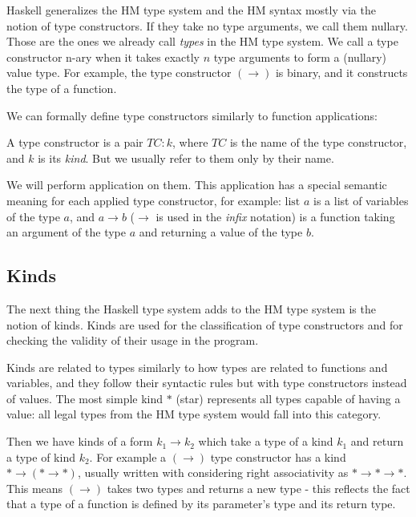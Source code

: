 Haskell generalizes the HM type system and the HM syntax mostly via the notion of type constructors. If they take no type arguments, we call them nullary. Those are the ones we already call \emph{types} in the HM type system. We call a type constructor n-ary when it takes exactly $n$ type arguments to form a (nullary) value type. For example, the type constructor $(\rightarrow)$ is binary, and it constructs the type of a function.

We can formally define type constructors similarly to function applications:

\begin{defn}
    A type constructor is a pair $TC : k$, where $TC$ is the name of the type constructor, and $k$ is its \emph{kind}. But we usually refer to them only by their name.

    We will perform application on them. This application has a special semantic meaning for each applied type constructor, for example: $\text{list } a$ is a list of variables of the type $a$, and $a \rightarrow b$ ($\rightarrow$ is used in the \emph{infix} notation) is a function taking an argument of the type $a$ and returning a value of the type $b$.
\end{defn}

\subsection{Kinds}

The next thing the Haskell type system adds to the HM type system is the notion of kinds. Kinds are used for the classification of type constructors and for checking the validity of their usage in the program.

Kinds are related to types similarly to how types are related to functions and variables, and they follow their syntactic rules but with type constructors instead of values. The most simple kind $*$ (star) represents all types capable of having a value: all legal types from the HM type system would fall into this category.

Then we have kinds of a form $k_1 \rightarrow k_2$ which take a type of a kind $k_1$ and return a type of kind $k_2$. For example a $(\rightarrow)$ type constructor has a kind $* \rightarrow (* \rightarrow *)$, usually written with considering right associativity as $* \rightarrow * \rightarrow *$. This means $(\rightarrow)$ takes two types and returns a new type - this reflects the fact that a type of a function is defined by its parameter's type and its return type.

